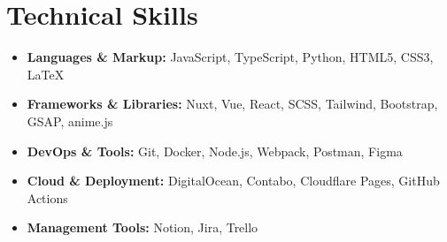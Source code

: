 \section*{Technical Skills}
%
%
%
\begin{itemize}
	\item \textbf{Languages \& Markup:} JavaScript, TypeScript, Python, HTML5, CSS3, LaTeX
	\item \textbf{Frameworks \& Libraries:} Nuxt, Vue, React, SCSS, Tailwind, Bootstrap, GSAP, anime.js
	\item \textbf{DevOps \& Tools:} Git, Docker, Node.js, Webpack, Postman, Figma
	\item \textbf{Cloud \& Deployment:} DigitalOcean, Contabo, Cloudflare Pages, GitHub Actions
	\item \textbf{Management Tools:} Notion, Jira, Trello
\end{itemize}
